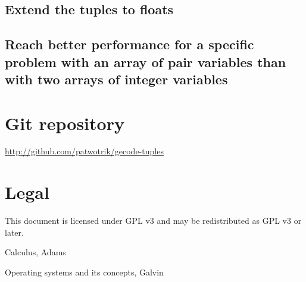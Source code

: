 \documentclass[a4paper,11pt]{article}
\begin{document}
\subsection{Extend the tuples to floats}
\subsection{Reach better performance for a specific problem with an array of pair variables than with two arrays of integer variables}

\section{Git repository}
\url{http://github.com/patwotrik/gecode-tuples}

\section{Legal}
This document is licensed under GPL v3 and may be redistributed as GPL v3 or later. 


\begin{thebibliography}{99}
	Calculus, 
	Adams
	
	Operating systems and its concepts,
	Galvin
	
\end{thebibliography}
\end{document}
